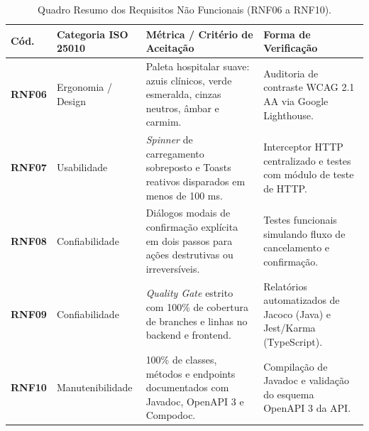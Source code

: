 \begin{table}[htb]
\centering
\small
\caption{Quadro Resumo dos Requisitos Não Funcionais (RNF06 a RNF10).}
\label{tab_rnf_consolidado_2}
\begin{tabularx}{\textwidth}{l >{\raggedright\arraybackslash}p{2.9cm} X >{\raggedright\arraybackslash}p{3.2cm}}
\toprule
\textbf{Cód.} & \textbf{Categoria ISO 25010} & \textbf{Métrica / Critério de Aceitação} & \textbf{Forma de Verificação} \\
\midrule
\textbf{RNF06} & Ergonomia / Design & Paleta hospitalar suave: azuis clínicos, verde esmeralda, cinzas neutros, âmbar e carmim. & Auditoria de contraste WCAG 2.1 AA via Google Lighthouse. \\
\midrule
\textbf{RNF07} & Usabilidade & \textit{Spinner} de carregamento sobreposto e Toasts reativos disparados em menos de 100 ms. & Interceptor HTTP centralizado e testes com módulo de teste de HTTP. \\
\midrule
\textbf{RNF08} & Confiabilidade & Diálogos modais de confirmação explícita em dois passos para ações destrutivas ou irreversíveis. & Testes funcionais simulando fluxo de cancelamento e confirmação. \\
\midrule
\textbf{RNF09} & Confiabilidade & \textit{Quality Gate} estrito com 100\% de cobertura de branches e linhas no backend e frontend. & Relatórios automatizados de Jacoco (Java) e Jest/Karma (TypeScript). \\
\midrule
\textbf{RNF10} & Manutenibilidade & 100\% de classes, métodos e endpoints documentados com Javadoc, OpenAPI 3 e Compodoc. & Compilação de Javadoc e validação do esquema OpenAPI 3 da API. \\
\bottomrule
\end{tabularx}
\end{table}

